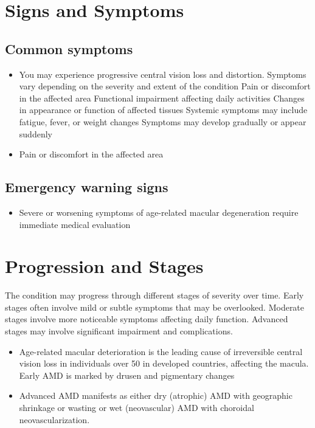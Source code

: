 \section{Signs and Symptoms}

\subsection{Common symptoms}
\begin{itemize}[noitemsep]
  \item You may experience progressive central vision loss and distortion. Symptoms vary depending on the severity and extent of the condition Pain or discomfort in the affected area Functional impairment affecting daily activities Changes in appearance or function of affected tissues Systemic symptoms may include fatigue, fever, or weight changes Symptoms may develop gradually or appear suddenly
  \item Pain or discomfort in the affected area
  \end{itemize}

\subsection{Emergency warning signs}
\begin{itemize}[noitemsep]
  \item Severe or worsening symptoms of age-related macular degeneration require immediate medical evaluation
\end{itemize}
\section{Progression and Stages}
The condition may progress through different stages of severity over time. Early stages often involve mild or subtle symptoms that may be overlooked. Moderate stages involve more noticeable symptoms affecting daily function. Advanced stages may involve significant impairment and complications.

\begin{itemize}[noitemsep]
  \item Age-related macular deterioration is the leading cause of irreversible central vision loss in individuals over 50 in developed countries, affecting the macula. Early AMD is marked by drusen and pigmentary changes
  \item Advanced AMD manifests as either dry (atrophic) AMD with geographic shrinkage or wasting or wet (neovascular) AMD with choroidal neovascularization.
\end{itemize}

